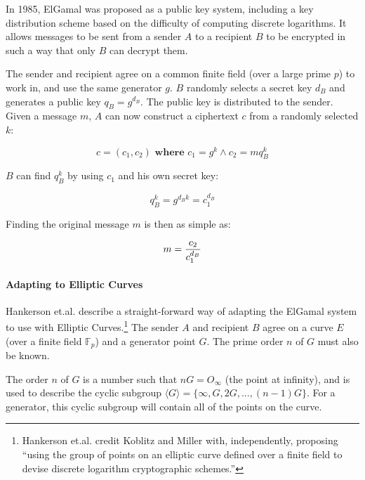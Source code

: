 \label{sec:math_encryption_elgamal}

In 1985, ElGamal was proposed as a public key system, including a key distribution scheme based
on the difficulty of computing discrete logarithms. It allows messages to be sent from a sender
\(A\) to a recipient \(B\) to be encrypted in such a way that only \(B\) can decrypt them.

The sender and recipient agree on a common finite field (over a large prime \(p\)) to work in,
and use the same generator \(g\). \(B\) randomly selects a secret key \(d_B\) and generates a
public key \(q_B = g^{d_B}\). The public key is distributed to the sender. Given a message \(m\),
\(A\) can now construct a ciphertext \(c\) from a randomly selected \(k\):\cite{elgamal}

\begin{equation}
	c = (c_1, c_2)  \textbf{ where }  c_1 = g^k \land c_2 = m q_B^k
\end{equation}

\(B\) can find \(q_B^k\) by using \(c_1\) and his own secret key:

\begin{equation}
	q_B^k = g^{d_B k} = c_1^{d_B}
\end{equation}

Finding the original message \(m\) is then as simple as:

\begin{equation}
    m = {c_2 \over c_1^{d_B}}
\end{equation}

\paragraph{Adapting to Elliptic Curves}
Hankerson et.al. describe a straight-forward way of adapting the ElGamal system to use with
Elliptic Curves.\footnote{Hankerson et.al. credit Koblitz and Miller with, independently, proposing
``using the group of points on an elliptic curve defined over a finite field to devise discrete
logarithm cryptographic schemes.''\cite{hankerson2010}} The sender \(A\) and recipient \(B\) agree on a curve \(E\)
(over a finite field \(\mathbb{F}_p\)) and a generator point \(G\). The prime order \(n\) of \(G\) must also be
known.

The order \(n\) of \(G\) is a number such that \(nG = O_{\infty}\) (the point at infinity), and is used to describe
the cyclic subgroup \(\langle G \rangle = \{ \infty, G, 2G, ..., (n-1)G \} \). For a generator, this cyclic subgroup
will contain all of the points on the curve.

